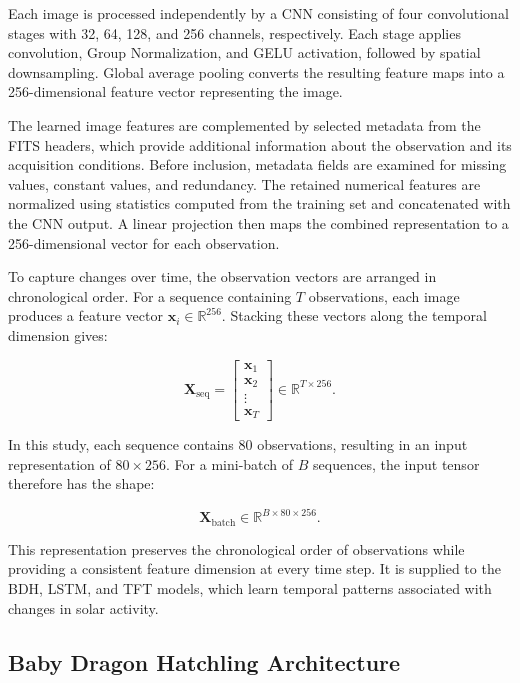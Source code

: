 \documentclass[oneside]{ieeeaccess}
\begin{document}
Each image is processed independently by a CNN consisting of four convolutional stages with 32, 64, 128, and 256 channels, respectively. Each stage applies convolution, Group Normalization, and GELU activation, followed by spatial downsampling. Global average pooling converts the resulting feature maps into a 256-dimensional feature vector representing the image.

The learned image features are complemented by selected metadata from the FITS headers, which provide additional information about the observation and its acquisition conditions. Before inclusion, metadata fields are examined for missing values, constant values, and redundancy. The retained numerical features are normalized using statistics computed from the training set and concatenated with the CNN output. A linear projection then maps the combined representation to a 256-dimensional vector for each observation.

To capture changes over time, the observation vectors are arranged in chronological order. For a sequence containing $T$ observations, each image produces a feature vector $\mathbf{x}_i \in \mathbb{R}^{256}$. Stacking these vectors along the temporal dimension gives:

\begin{equation}
\mathbf{X}_{\mathrm{seq}} =
\begin{bmatrix}
\mathbf{x}_1 \\
\mathbf{x}_2 \\
\vdots \\
\mathbf{x}_T
\end{bmatrix}
\in \mathbb{R}^{T \times 256}.
\end{equation}

In this study, each sequence contains 80 observations, resulting in an input representation of $80 \times 256$. For a mini-batch of $B$ sequences, the input tensor therefore has the shape:

\begin{equation}
\mathbf{X}_{\mathrm{batch}} \in
\mathbb{R}^{B \times 80 \times 256}.
\end{equation}

This representation preserves the chronological order of observations while providing a consistent feature dimension at every time step. It is supplied to the BDH, LSTM, and TFT models, which learn temporal patterns associated with changes in solar activity.

\subsection{Baby Dragon Hatchling Architecture}
\end{document}

